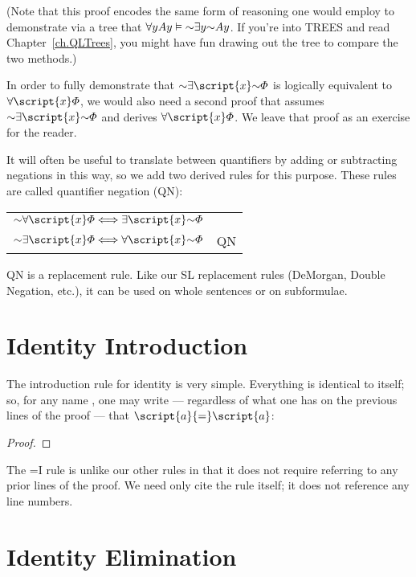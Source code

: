 (Note that this proof encodes the same form of reasoning one would employ to demonstrate via a tree that $\qt{\forall}{y} Ay \models \enot \qt{\exists}{y} \enot Ay$. If you're into TREES and read Chapter~\ref{ch.QLTrees}, you might have fun drawing out the tree to compare the two methods.)

In order to fully demonstrate that $\enot\qt{\exists}{\script{x}}\enot\metaA{}$ is logically equivalent to $\qt{\forall}{\script{x}}\metaA{}$, we would also need a second proof that assumes $\enot\qt{\exists}{\script{x}}\enot\metaA{}$ and derives $\qt{\forall}{\script{x}}\metaA{}$. We leave that proof as an exercise for the reader.

It will often be useful to translate between quantifiers by adding or subtracting negations in this way, so we add two derived rules for this purpose. These rules are called quantifier negation (QN):
\begin{center}
\begin{tabular}{rl}
$\enot\qt{\forall}{\script{x}}\metaA{} \Longleftrightarrow \qt{\exists}{\script{x}}\enot\metaA{}$\\
$\enot\qt{\exists}{\script{x}}\metaA{} \Longleftrightarrow \qt{\forall}{\script{x}}\enot\metaA{}$
& QN
\end{tabular}
\end{center}
QN is a replacement rule. Like our SL replacement rules (DeMorgan, Double Negation, etc.), it can be used on whole sentences or on subformulae.

\section{Identity Introduction}

The introduction rule for identity is very simple. Everything is identical to itself; so, for any name , one may write --- regardless of what one has on the previous lines of the proof --- that $\script{a}{=}\script{a}$:

\begin{proof}
	 
\end{proof}

The {=}I rule is unlike our other rules in that it does not require referring to any prior lines of the proof. We need only cite the rule itself; it does not reference any line numbers.

\section{Identity Elimination}


